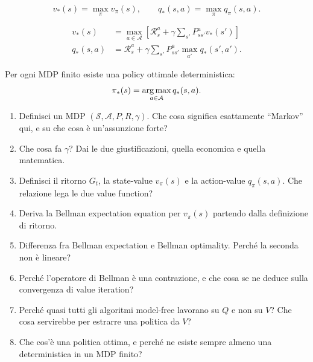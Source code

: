 \begin{definition}
\[
v_*(s) = \max_\pi v_\pi(s), \qquad q_*(s,a) = \max_\pi q_\pi(s,a).
\]
\end{definition}

\begin{theorem}
\begin{align}
v_*(s) &= \max_{a\in\mathcal{A}}\!\left[\mathcal{R}^a_s + \gamma \sum_{s'} P^a_{ss'} v_*(s')\right]\\
q_*(s,a) &= \mathcal{R}^a_s + \gamma \sum_{s'} P^a_{ss'} \max_{a'} q_*(s', a').
\end{align}
\end{theorem}

\begin{remark}
Per ogni MDP finito esiste una policy ottimale deterministica:
\[
\pi_*(s) = \operatorname*{arg\,max}_{a\in\mathcal{A}} q_*(s, a).
\]
\end{remark}

\begin{tcolorbox}[mywarn, title={Domande d'esame — Fondamenti di RL}]
\begin{enumerate}
  \item Definisci un MDP $(\mathcal{S}, \mathcal{A}, P, R, \gamma)$. Che cosa significa esattamente ``Markov'' qui, e su che cosa è un'assunzione forte?
  \item Che cosa fa $\gamma$? Dai le due giustificazioni, quella economica e quella matematica.
  \item Definisci il ritorno $G_t$, la state-value $v_\pi(s)$ e la action-value $q_\pi(s,a)$. Che relazione lega le due value function?
  \item Deriva la Bellman expectation equation per $v_\pi(s)$ partendo dalla definizione di ritorno.
  \item Differenza fra Bellman expectation e Bellman optimality. Perché la seconda non è lineare?
  \item Perché l'operatore di Bellman è una contrazione, e che cosa se ne deduce sulla convergenza di value iteration?
  \item Perché quasi tutti gli algoritmi model-free lavorano su $Q$ e non su $V$? Che cosa servirebbe per estrarre una politica da $V$?
  \item Che cos'è una politica ottima, e perché ne esiste sempre almeno una deterministica in un MDP finito?
\end{enumerate}
\end{tcolorbox}

